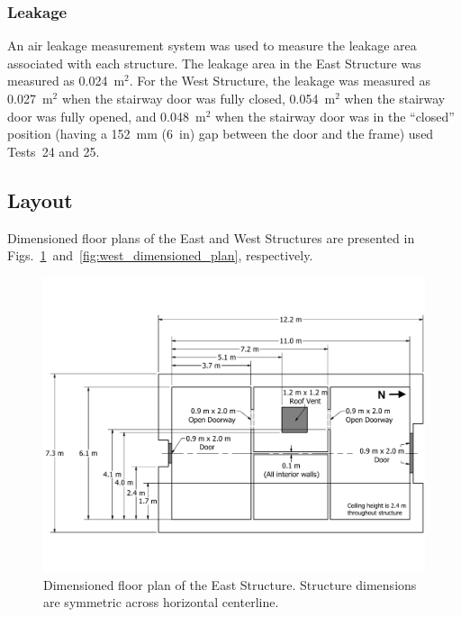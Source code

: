 \documentclass[12pt,oneside]{book}
\begin{document}
\subsubsection{Leakage}
An air leakage measurement system was used to measure the leakage area associated with each structure. The leakage area in the East Structure was measured as 0.024~m$^2$. For the West Structure, the leakage was measured as 0.027~m$^2$ when the stairway door was fully closed, 0.054~m$^2$ when the stairway door was fully opened, and 0.048~m$^2$ when the stairway door was in the ``closed'' position (having a 152~mm (6~in) gap between the door and the frame) used Tests~24 and 25.
\clearpage

\subsection{Layout}
\label{sec:layout}

Dimensioned floor plans of the East and West Structures are presented in Figs.~\ref{fig:east_dimensioned_plan}~and~\ref{fig:west_dimensioned_plan}, respectively.

\begin{figure}[!ht]
	\includegraphics[width=\columnwidth]{../Figures/Floor_Plans/East_Structure_Dimensioned_Full}
	\caption[Dimensioned floor plan of the East Structure.]{Dimensioned floor plan of the East Structure. Structure dimensions are symmetric across horizontal centerline.}
	\label{fig:east_dimensioned_plan}
\end{figure}
\end{document}
